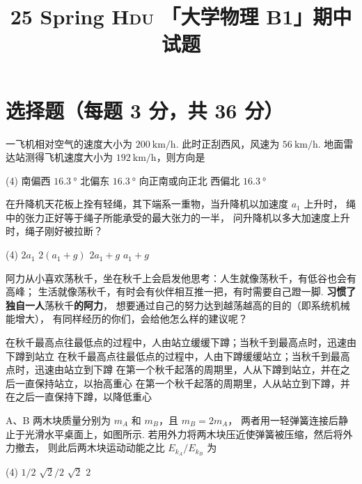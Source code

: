 \documentclass[quiet]{ctexart}
\title{\sffamily\bfseries 25 Spring \textsc{Hdu} 「大学物理 B1」期中 试题}
\author{} \date{}
\let \emph \textbf
\begin{document}
\maketitle

\section{选择题（每题 3 分，共 36 分）}

\begin{problem}
  一飞机相对空气的速度大小为 $\qty{200}{\km/\hour}$.
  此时正刮西风，风速为 $\qty{56}{\km/\hour}$.
  地面雷达站测得飞机速度大小为 $\qty{192}{\km/\hour}$，则方向是
  \begin{tasks}(4)
    \task 南偏西 $\qty{16.3}\degree$
    \task 北偏东 $\qty{16.3}\degree$
    \task 向正南或向正北
    \task 西偏北 $\qty{16.3}\degree$
  \end{tasks}
\end{problem}
\begin{solution}

\end{solution}

\begin{problem}
  在升降机天花板上拴有轻绳，其下端系一重物，当升降机以加速度 $a_1$ 上升时，
  绳中的张力正好等于绳子所能承受的最大张力的一半，
  问升降机以多大加速度上升时，绳子刚好被拉断？
  \begin{tasks}(4)
    \task $2a_1$
    \task $2(a_1 + g)$
    \task $2a_1 + g$
    \task $a_1 + g$
  \end{tasks}
\end{problem}
\begin{solution}
  
\end{solution}

\begin{problem}
  阿力从小喜欢荡秋千，坐在秋千上会启发他思考：人生就像荡秋千，有低谷也会有高峰；
  生活就像荡秋千，有时会有伙伴相互推一把，有时需要自己蹬一脚.
  \emph{习惯了独自一人}\textcolor{gray!50}{荡秋千}\emph{的阿力}，
  想要通过自己的努力达到越荡越高的目的（即系统机械能增大），
  有同样经历的你们，会给他怎么样的建议呢？
  \begin{tasks}
    \task 在秋千最高点往最低点的过程中，人由站立缓缓下蹲；当秋千到最高点时，迅速由下蹲到站立
    \task 在秋千最高点往最低点的过程中，人由下蹲缓缓站立；当秋千到最高点时，迅速由站立到下蹲
    \task 在第一个秋千起落的周期里，人从下蹲到站立，并在之后一直保持站立，以抬高重心
    \task 在第一个秋千起落的周期里，人从站立到下蹲，并在之后一直保持下蹲，以降低重心
  \end{tasks}
\end{problem}
\begin{solution}
  
\end{solution}

\begin{problem}
  A、B 两木块质量分别为 $m_A$ 和 $m_B$，且 $m_B = 2m_A$，
  两者用一轻弹簧连接后静止于光滑水平桌面上，如图所示. 
  若用外力将两木块压近使弹簧被压缩，然后将外力撤去，
  则此后两木块运动动能之比 $E_{k_A}/E_{k_B}$ 为
  \begin{tasks}(4)
    \task $1/2$
    \task $\sqrt2/2$
    \task $\sqrt2$
    \task $2$
  \end{tasks}
\end{problem}
\end{document}
